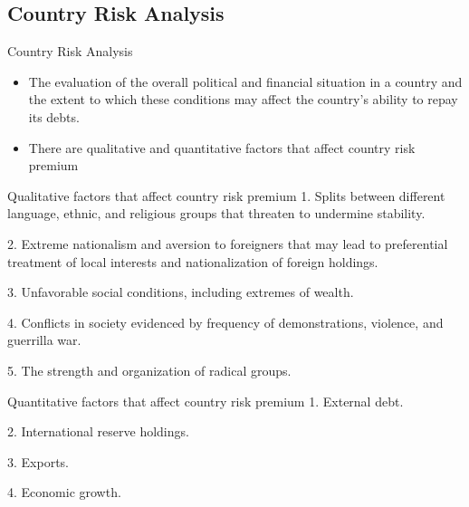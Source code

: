 \documentclass[international_finance_p2.tex]{subfiles}
\begin{document}
\subsection{Country Risk Analysis}
\begin{frame}{Country Risk Analysis}
\begin{itemize}[<+->]
\item
The evaluation of the overall political and financial situation in a country and the extent to which these conditions may affect the country’s ability to repay its debts.
\item
There are qualitative and quantitative factors that affect country risk premium
\end{itemize}
\end{frame}
\begin{frame}{Qualitative factors that affect country risk premium}
1. Splits between different language, ethnic, and religious groups that threaten to undermine stability. 

2. Extreme nationalism and aversion to foreigners that may lead to preferential treatment of local interests and nationalization of foreign holdings. 

3. Unfavorable social conditions, including extremes of wealth. 

4. Conflicts in society evidenced by frequency of demonstrations, violence, and guerrilla war.
 
5. The strength and organization of radical groups.
\end{frame}
\begin{frame}{Quantitative factors that affect country risk premium}
1. External debt. 

2. International reserve holdings. 

3. Exports. 

4. Economic growth.
\end{frame}
\end{document}
